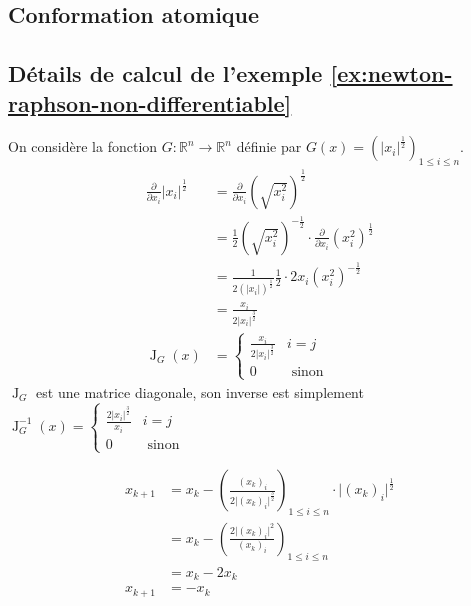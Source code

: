 \documentclass[3p, twocolumn]{elsarticle}
\DeclareMathOperator{\Jacobian}{J}
\begin{document}
\subsection{Conformation atomique}
\cleardoublepage
\begin{appendices}
    \section{Détails de calcul de l'exemple \ref{ex:newton-raphson-non-differentiable}}
    \label{ap:calcul-exemple-nr}
    On considère la fonction $G:\mathbb R^n\rightarrow \mathbb R^n$ définie par $G(x)=\left(\lvert x_i\rvert^{\frac12}\right)_{1\leq i\leq n}$.
    \begin{align*}
        \frac{\partial}{\partial x_i}\lvert x_i\rvert^{\frac12} & = \frac{\partial}{\partial x_i}\left(\sqrt{x_i^2}\right)^{\frac12}                                          \\
                                                                & = \frac12\left(\sqrt{x_i^2}\right)^{-\frac12}\cdot\frac{\partial}{\partial x_i}\left(x_i^2\right)^{\frac12} \\
                                                                & = \frac1{2(\lvert x_i\rvert)^{\frac12}}\frac12\cdot2x_i(x_i^2)^{-\frac12}                                   \\
                                                                & = \frac{x_i}{2\lvert x_i\rvert^{\frac32}}                                                                   \\
        \Jacobian_G(x)                                          & = \begin{cases}
            \frac{x_i}{2\lvert x_i\rvert^{\frac32}} & i=j             \\
            0                                       & \textrm{ sinon}
        \end{cases}
    \end{align*}
    $\Jacobian_G$ est une matrice diagonale, son inverse est simplement $\Jacobian^{-1}_G(x)=\begin{cases}\frac{2\lvert x_i\rvert^{\frac32}}{x_i}&i=j\\0&\textrm{ sinon}\end{cases}$

    \begin{align*}
        x_{k+1} & = x_k - \left(\frac{(x_k)_i}{2\lvert (x_k)_i\rvert^{\frac32}}\right)_{1\leq i\leq n}\cdot \lvert (x_k)_i\vert ^{\frac12} \\
                & = x_k - \left(\frac{2\lvert (x_k)_i \rvert^{2}}{(x_k)_i}\right)_{1\leq i\leq n}                                          \\
                & = x_k - 2x_k                                                                                                             \\
        x_{k+1} & = - x_k
    \end{align*}
\end{appendices}

\cleardoublepage
\nocite{*}


{}
\end{document}
